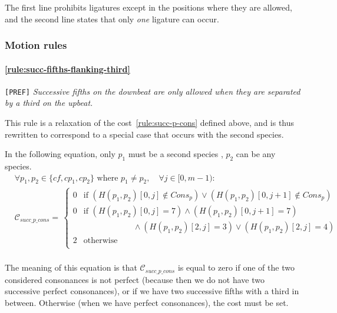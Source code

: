     The first line prohibits ligatures except in the positions where they are allowed, and the second line states that only \textit{one} ligature can occur.

\subsubsection{Motion rules}
\paragraph{\hspace{.6cm}\ref{rule:succ-fifths-flanking-third}} \texttt{[PREF]} \textit{Successive fifths on the downbeat are only allowed when they are separated by a third on the upbeat.} 

    This rule is a relaxation of the cost~\ref{rule:succ-p-cons} defined above, and is thus rewritten to correspond to a special case that occurs with the second species.
        
    In the following equation, only $p_1$ must be a second species \cp, $p_2$ can be any species.
    \begin{equation}
        \begin{aligned}
            & \forall p_1, p_2 \in \{\mathit{cf}, cp_1, cp_2\} \text{ where }  p_1 \neq p_2, \quad \forall j \in [0, m-1): \\
            &\mathcal{C}_{succ\_p\_cons} = \,  
            \begin{cases}
                0 & \text{if } (H(p_1, p_2)[0, j] \notin Cons_p) \lor (H(p_1, p_2)[0, j+1] \notin Cons_p)\\
                0 & \text{if } (H(p_1, p_2)[0, j] = 7 ) \land (H(p_1, p_2)[0, j+1] = 7) \\
                & \quad \quad \quad \quad \quad \quad\land (H(p_1, p_2)[2, j] = 3) \lor (H(p_1, p_2)[2, j] = 4)\\
                2 & \text{otherwise } \\
            \end{cases}\\
        \end{aligned}
    \end{equation}

    The meaning of this equation is that $\mathcal{C}_{succ\_p\_cons}$ is equal to zero if one of the two considered consonances is not perfect (because then we do not have two successive perfect consonances), or if we have two successive fifths with a third in between. Otherwise (when we have perfect consonances), the cost must be set.

